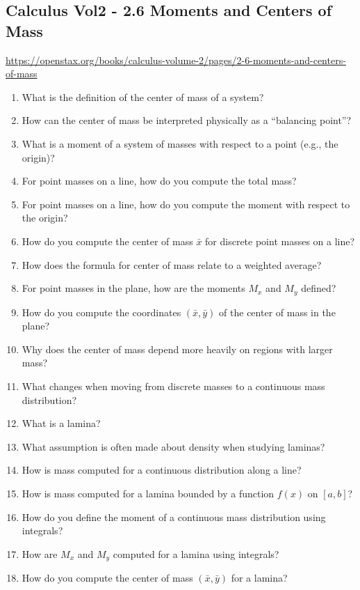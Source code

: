 \subsection{Calculus Vol2 - 2.6 Moments and Centers of Mass}

\url{https://openstax.org/books/calculus-volume-2/pages/2-6-moments-and-centers-of-mass}

\begin{enumerate}
  \item What is the definition of the center of mass of a system?
  \item How can the center of mass be interpreted physically as a “balancing point”?
  \item What is a moment of a system of masses with respect to a point (e.g., the origin)?
  \item For point masses on a line, how do you compute the total mass?
  \item For point masses on a line, how do you compute the moment with respect to the origin?
  \item How do you compute the center of mass \(\bar{x}\) for discrete point masses on a line?
  \item How does the formula for center of mass relate to a weighted average?
  \item For point masses in the plane, how are the moments \(M_{x}\) and \(M_{y}\) defined?
  \item How do you compute the coordinates \((\bar{x}, \bar{y})\) of the center of mass in the plane?
  \item Why does the center of mass depend more heavily on regions with larger mass?
  \item What changes when moving from discrete masses to a continuous mass distribution?
  \item What is a lamina?
  \item What assumption is often made about density when studying laminas?
  \item How is mass computed for a continuous distribution along a line?
  \item How is mass computed for a lamina bounded by a function \(f(x)\) on \([a,b]\)?
  \item How do you define the moment of a continuous mass distribution using integrals?
  \item How are \(M_{x}\) and \(M_{y}\) computed for a lamina using integrals?
  \item How do you compute the center of mass \((\bar{x}, \bar{y})\) for a lamina?

\end{enumerate}
